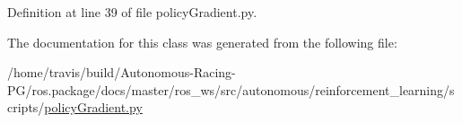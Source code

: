 Definition at line 39 of file policy\+Gradient.\+py.



The documentation for this class was generated from the following file\+:\begin{DoxyCompactItemize}
\item 
/home/travis/build/\+Autonomous-\/\+Racing-\/\+P\+G/ros.\+package/docs/master/ros\+\_\+ws/src/autonomous/reinforcement\+\_\+learning/scripts/\hyperlink{policy_gradient_8py}{policy\+Gradient.\+py}\end{DoxyCompactItemize}
